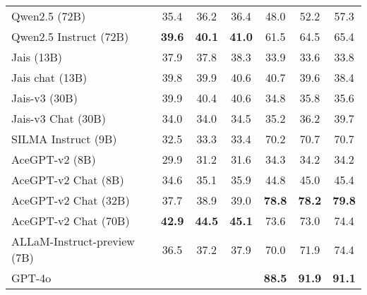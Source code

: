 \begin{table*}[h!]
{\begin{tabular}{lcccccc}
Qwen2.5 (72B)                                 & 35.4                & 36.2                & 36.4                     & 48.0                & 52.2                & 57.3                      \\
Qwen2.5 Instruct (72B)                        & \textbf{39.6}       & \textbf{40.1}       & \textbf{41.0}            & 61.5                & 64.5                 & 65.4                      \\ 
\hline
Jais (13B)                                    & 37.9                 & 37.8                 & 38.3                      & 33.9                 & 33.6                 & 33.8                       \\
Jais chat (13B)                               & 39.8                 & 39.9                 & 40.6                      & 40.7                 & 39.6                 & 38.4                       \\
Jais-v3 (30B)                                 & 39.9                 & 40.4                 & 40.6                      & 34.8                 & 35.8                 & 35.6                       \\
Jais-v3 Chat (30B)                            & 34.0                   & 34.0                   & 34.5                      & 35.2                 & 36.2                 & 39.7                       \\ 
\hdashline
SILMA Instruct (9B)                           & 32.5                 & 33.3                 & 33.4                      & 70.2                 & 70.7                 & 70.7                       \\ 
\hdashline
AceGPT-v2 (8B)                                & 29.9                & 31.2                & 31.6                     & 34.3                & 34.2                & 34.2                      \\
AceGPT-v2 Chat (8B)                           & 34.6                & 35.1                & 35.9                     & 44.8                 & 45.0                   & 45.4                       \\
AceGPT-v2 Chat (32B)                          & 37.7                & 38.9                & 39.0                        & \textbf{78.8}       & \textbf{78.2}       & \textbf{79.8}             \\
AceGPT-v2 Chat (70B)                          & \textbf{42.9}       & \textbf{44.5}       & \textbf{45.1}            & 73.6                & 73.0                & 74.4
\\ 
\hdashline
ALLaM-Instruct-preview (7B)                           & 36.5                 &37.2                 & 37.9                      & 70.0                 & 71.9                 & 74.4                       \\ 
\hline
GPT-4o                                        &                      &                      &                           & \textbf{88.5}        & \textbf{91.9}        & \textbf{91.1}              \\ 
\hline



\end{tabular}}
\end{table*}

